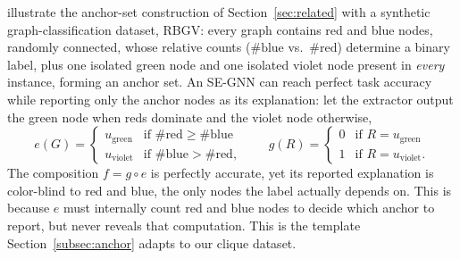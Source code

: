 \documentclass{article}
\theoremstyle{definition}
\begin{document}
\citet{azzolin2026gnnexplanations} illustrate the anchor-set construction of
Section~\ref{sec:related} with a synthetic graph-classification dataset, RBGV:
every graph contains red and blue nodes, randomly connected, whose relative
counts ($\#\text{blue}$ vs.\ $\#\text{red}$) determine a binary label, plus one
isolated green node and one isolated violet node present in \emph{every}
instance, forming an anchor set. An SE-GNN can reach perfect task accuracy
while reporting only the anchor nodes as its explanation: let the extractor
output the green node when reds dominate and the violet node otherwise,
\begin{equation}
  e(G) = \begin{cases} u_{\text{green}} & \text{if } \#\text{red} \geq \#\text{blue} \\
                        u_{\text{violet}} & \text{if } \#\text{blue} > \#\text{red}, \end{cases}
  \qquad
  g(R) = \begin{cases} 0 & \text{if } R = u_{\text{green}} \\
                        1 & \text{if } R = u_{\text{violet}}. \end{cases}
\end{equation}
The composition $f = g \circ e$ is perfectly accurate, yet its reported
explanation is color-blind to red and blue, the only nodes the label
actually depends on. This is because $e$ must internally count red and blue
nodes to decide which anchor to report, but never reveals that computation.
This is the template Section~\ref{subsec:anchor} adapts to our clique
dataset.
\end{document}
